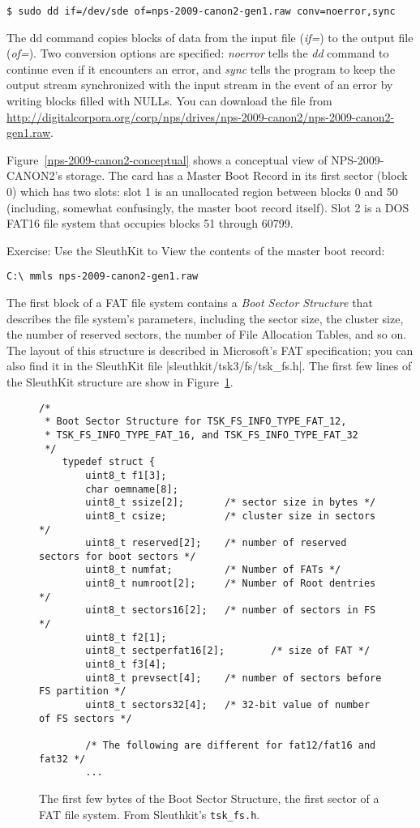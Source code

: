 \documentclass[11pt,letter]{book}
\newcommand{\figref}[1]{Figure~\ref{#1}\xspace}
\begin{document}
\begin{Verbatim}
$ sudo dd if=/dev/sde of=nps-2009-canon2-gen1.raw conv=noerror,sync
\end{Verbatim} 
The dd command copies blocks of data from the input file (\emph{if=})
to the output file (\emph{of=}). Two conversion options are
specified: \emph{noerror} tells the \emph{dd} command to continue even
if it encounters an error, and \emph{sync} tells the program to keep
the output stream synchronized with the input stream in the event of
an error by writing blocks filled with NULLs.  You can download the
file from \url{http://digitalcorpora.org/corp/nps/drives/nps-2009-canon2/nps-2009-canon2-gen1.raw}.

\figref{nps-2009-canon2-conceptual} shows a conceptual view of
NPS-2009-CANON2's storage. The card has a Master Boot Record in its
first sector (block 0) which has two slots: slot 1 is an unallocated
region between blocks 0 and 50 (including, somewhat confusingly, the
master boot record itself). Slot 2 is a DOS FAT16 file system that
occupies blocks 51 through 60799. 

Exercise: Use the SleuthKit to View the contents of the master boot
record:

\begin{Verbatim}
C:\ mmls nps-2009-canon2-gen1.raw
\end{Verbatim}

The first block of a FAT file system contains a \emph{Boot Sector
  Structure} that describes the file system's parameters, including
the sector size, the cluster size, the number of reserved sectors, the
number of File Allocation Tables, and so on. The layout of this
structure is described in Microsoft's FAT specification; you can also
find it in the SleuthKit file |sleuthkit/tsk3/fs/tsk_fs.h|. The first
few lines of the SleuthKit structure are show in \figref{BSS}.

\begin{figure}
\begin{lstlisting}
/*
 * Boot Sector Structure for TSK_FS_INFO_TYPE_FAT_12,
 * TSK_FS_INFO_TYPE_FAT_16, and TSK_FS_INFO_TYPE_FAT_32
 */
    typedef struct {
        uint8_t f1[3];
        char oemname[8];
        uint8_t ssize[2];       /* sector size in bytes */
        uint8_t csize;          /* cluster size in sectors */
        uint8_t reserved[2];    /* number of reserved sectors for boot sectors */
        uint8_t numfat;         /* Number of FATs */
        uint8_t numroot[2];     /* Number of Root dentries */
        uint8_t sectors16[2];   /* number of sectors in FS */
        uint8_t f2[1];
        uint8_t sectperfat16[2];        /* size of FAT */
        uint8_t f3[4];
        uint8_t prevsect[4];    /* number of sectors before FS partition */
        uint8_t sectors32[4];   /* 32-bit value of number of FS sectors */

        /* The following are different for fat12/fat16 and fat32 */
        ...
\end{lstlisting}
\caption{The first few bytes of the Boot Sector Structure, the first
  sector of a FAT file system. From Sleuthkit's \texttt{tsk\_fs.h}.\label{BSS}}
\end{figure}
\end{document}
